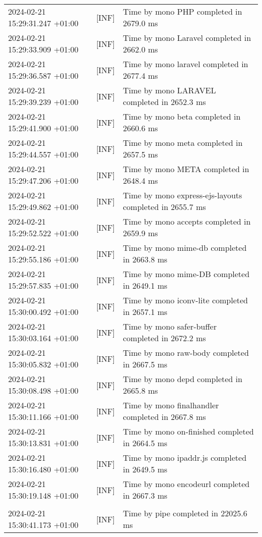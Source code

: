 {{\begin{tabularx}{\textwidth}{|l|l|X|}
                    2024-02-21 15:29:31.247 +01:00 & [INF] & Time by mono PHP completed in 2679.0 ms \\
                    2024-02-21 15:29:33.909 +01:00 & [INF] & Time by mono Laravel completed in 2662.0 ms \\
                    2024-02-21 15:29:36.587 +01:00 & [INF] & Time by mono laravel completed in 2677.4 ms \\
                    2024-02-21 15:29:39.239 +01:00 & [INF] & Time by mono LARAVEL completed in 2652.3 ms \\
                    2024-02-21 15:29:41.900 +01:00 & [INF] & Time by mono beta completed in 2660.6 ms \\
                    2024-02-21 15:29:44.557 +01:00 & [INF] & Time by mono meta completed in 2657.5 ms \\
                    2024-02-21 15:29:47.206 +01:00 & [INF] & Time by mono META completed in 2648.4 ms \\
                    2024-02-21 15:29:49.862 +01:00 & [INF] & Time by mono express-ejs-layouts completed in 2655.7 ms \\
                    2024-02-21 15:29:52.522 +01:00 & [INF] & Time by mono accepts completed in 2659.9 ms \\
                    2024-02-21 15:29:55.186 +01:00 & [INF] & Time by mono mime-db completed in 2663.8 ms \\
                    2024-02-21 15:29:57.835 +01:00 & [INF] & Time by mono mime-DB completed in 2649.1 ms \\
                    2024-02-21 15:30:00.492 +01:00 & [INF] & Time by mono iconv-lite completed in 2657.1 ms \\
                    2024-02-21 15:30:03.164 +01:00 & [INF] & Time by mono safer-buffer completed in 2672.2 ms \\
                    2024-02-21 15:30:05.832 +01:00 & [INF] & Time by mono raw-body completed in 2667.5 ms \\
                    2024-02-21 15:30:08.498 +01:00 & [INF] & Time by mono depd completed in 2665.8 ms \\
                    2024-02-21 15:30:11.166 +01:00 & [INF] & Time by mono finalhandler completed in 2667.8 ms \\
                    2024-02-21 15:30:13.831 +01:00 & [INF] & Time by mono on-finished completed in 2664.5 ms \\
                    2024-02-21 15:30:16.480 +01:00 & [INF] & Time by mono ipaddr.js completed in 2649.5 ms \\
                    2024-02-21 15:30:19.148 +01:00 & [INF] & Time by mono encodeurl completed in 2667.3 ms \\
                    & & \\
                    2024-02-21 15:30:41.173 +01:00 & [INF] & Time by pipe completed in 22025.6 ms \\
                    \hline
                \end{tabularx}
            }
        }

